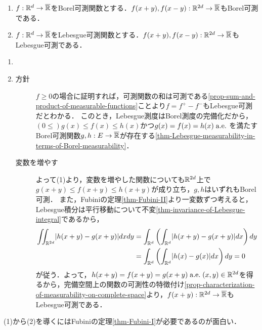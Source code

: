 \documentclass[uplatex, dvipdfmx]{jsreport}
\begin{document}
\begin{proposition}[Lebesgue可測関数の平行移動]\label{prop-pararell-shift-of-Lebesgue-measurable-function}\mbox{}
    \begin{enumerate}
        \item $f:\mathbb{R}^d\to\overline{\mathbb{R}}$をBorel可測関数とする．$f(x+y),f(x-y):\mathbb{R}^{2d}\to\overline{\mathbb{R}}$もBorel可測である．
        \item $f:\mathbb{R}^d\to\overline{\mathbb{R}}$をLebesgue可測関数とする．$f(x+y),f(x-y):\mathbb{R}^{2d}\to\overline{\mathbb{R}}$もLebesgue可測である．
    \end{enumerate}
\end{proposition}
\begin{Proof}\mbox{}
    \begin{enumerate}
        \item 
        \item 
        \begin{description}
            \item[方針] $f\ge 0$の場合に証明すれば，可測関数の和は可測である\ref{prop-sum-and-product-of-measurable-functions}ことより$f=f^+-f^-$もLebesgue可測だとわかる．
            このとき，Lebesgue測度はBorel測度の完備化だから，$(0\le)g(x)\le f(x)\le h(x)$かつ$g(x)=f(x)=h(x)\;\mathrm{a.e.}\;$を満たすBorel可測関数$g,h:E\to\overline{\mathbb{R}}$が存在する\ref{thm-Lebesgue-measurability-in-terms-of-Borel-measurability}．
            \item[変数を増やす]
            よって(1)より，変数を増やした関数についても$\mathbb{R}^{2d}$上で$g(x+y)\le f(x+y)\le h(x+y)$が成り立ち，$g,h$はいずれもBorel可測．
            また，Fubiniの定理\ref{thm-Fubini-II}より一変数ずつ考えると，Lebesgue積分は平行移動について不変\ref{thm-invariance-of-Lebesgue-integral}であるから，
            \begin{align*}
                \iint_{\mathbb{R}^{2d}}\lvert h(x+y)-g(x+y)\rvert dxdy&=\int_{\mathbb{R}^d}\left(\int_{\mathbb{R}^d}\lvert h(x+y)-g(x+y)\rvert dx\right)dy\\
                &=\int_{\mathbb{R}^d}\left(\int_{\mathbb{R}^d}\lvert h(x)-g(x)\rvert dx\right)dy=0
            \end{align*}
            が従う．よって，$h(x+y)=f(x+y)=g(x+y)\;\mathrm{a.e.}\; (x,y)\in\mathbb{R}^{2d}$を得るから，完備空間上の関数の可測性の特徴付け\ref{prop-characterization-of-measurability-on-complete-space}より，$f(x+y):\mathbb{R}^{2d}\to\overline{\mathbb{R}}$もLebesgue可測である．
        \end{description}
    \end{enumerate}
\end{Proof}
\begin{remarks}
    (1)から(2)を導くにはFubiniの定理\ref{thm-Fubini-I}が必要であるのが面白い．
\end{remarks}
\end{document}
